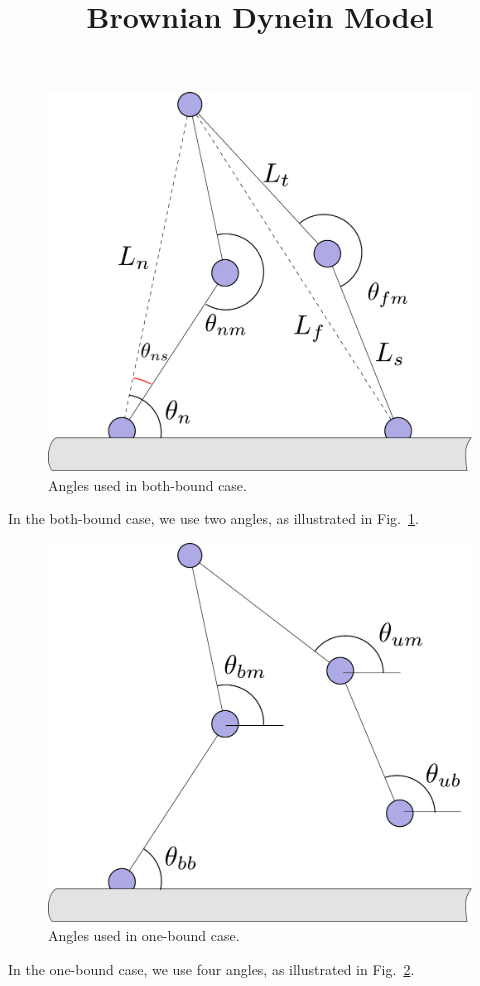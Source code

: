 \documentclass[11pt,twocolumn]{article}
\title{Brownian Dynein Model}
\begin{document}
\maketitle

\begin{figure}
  \includegraphics[width=\columnwidth]{../figures/code-bothbound}
  \caption{Angles used in both-bound case.}\label{fig:bothbound}
\end{figure}

In the both-bound case, we use two angles, as illustrated in
Fig.~\ref{fig:bothbound}.

\begin{figure}
  \includegraphics[width=\columnwidth]{../figures/code-onebound}
  \caption{Angles used in one-bound case.}\label{fig:onebound}
\end{figure}

In the one-bound case, we use four angles, as illustrated in
Fig.~\ref{fig:onebound}.
\end{document}
